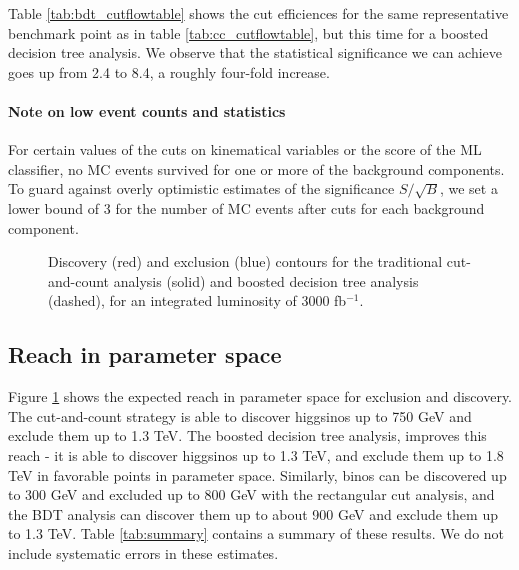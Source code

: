 Table \ref{tab:bdt_cutflowtable} shows the cut efficiences for the same representative benchmark point as in table \ref{tab:cc_cutflowtable}, but this time for a boosted decision tree analysis. We observe that the statistical significance we can achieve goes up from 2.4 to 8.4, a roughly four-fold increase.

\paragraph{Note on low event counts and statistics} For certain values of the cuts on kinematical variables or the score of the ML classifier, no MC events survived for one or more of the background components. To guard against overly optimistic estimates of the significance $S/\sqrt{B}$, we set a lower bound of 3 for the number of MC events after cuts for each background component.

\strictpagecheck
\begin{figure}[h]
  \begin{sidecaption}{Discovery (red) and exclusion (blue) contours for the traditional cut-and-count analysis (solid) and boosted decision tree analysis (dashed), for an integrated luminosity of 3000 fb$^{-1}$.}
\centering

\label{fig:contours}
\end{sidecaption}
\end{figure}

\subsection{Reach in parameter space}

Figure \ref{fig:contours} shows the expected reach in parameter space for exclusion and discovery. The cut-and-count strategy is able to discover higgsinos up to 750 GeV  and exclude them up to 1.3 TeV. The boosted decision tree analysis, improves this reach - it is able to discover higgsinos up to 1.3 TeV, and exclude them up to 1.8 TeV in favorable points in parameter space. Similarly, binos can be discovered up to 300 GeV and excluded up to 800 GeV with the rectangular cut analysis, and the BDT analysis can discover them up to about 900 GeV and exclude them up to 1.3 TeV. Table \ref{tab:summary} contains a summary of these results. We do not include systematic errors in these estimates.  

